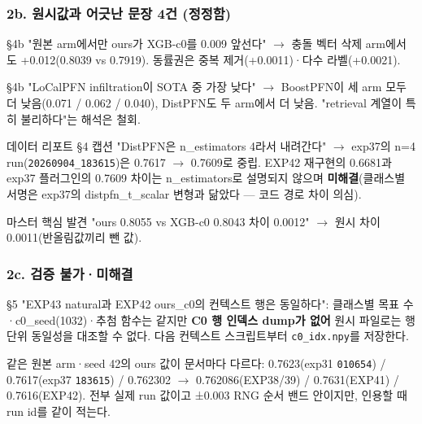 \subsubsection{2b. 원시값과 어긋난 문장 4건 (정정함)}
\par\noindent \textbullet{} §4b "원본 arm에서만 ours가 XGB-c0를 0.009 앞선다"  \ensuremath{\rightarrow}  충돌 벡터 삭제 arm에서도 +\allowbreak{}0.012(0.8039 vs 0.7919). 동률권은 중복 제거(+\allowbreak{}0.0011)·다수 라벨(+\allowbreak{}0.0021).


\par\noindent \textbullet{} §4b "LoCalPFN infiltration이 SOTA 중 가장 낮다"  \ensuremath{\rightarrow}  BoostPFN이 세 arm 모두 더 낮음(0.071 /\allowbreak{} 0.062 /\allowbreak{} 0.040), DistPFN도 두 arm에서 더 낮음. "retrieval 계열이 특히 불리하다"는 해석은 철회.


\par\noindent \textbullet\enspace 데이터 리포트 §4 캡션 "DistPFN은 n\_\allowbreak{}estimators 4라서 내려간다"  \ensuremath{\rightarrow}  exp37의 n=\allowbreak{}4 run(\texttt{20260904\allowbreak{}\_\allowbreak{}\allowbreak{}183615})은 0.7617 \ensuremath{\rightarrow} 0.7609로 중립. EXP42 재구현의 0.6681과 exp37 플러그인의 0.7609 차이는 n\_\allowbreak{}estimators로 설명되지 않으며 \textbf{미해결}(클래스별 서명은 exp37의 distpfn\_\allowbreak{}t\_\allowbreak{}scalar 변형과 닮았다 — 코드 경로 차이 의심).


\par\noindent \textbullet\enspace 마스터 핵심 발견 "ours 0.8055 vs XGB-c0 0.8043 차이 0.0012"  \ensuremath{\rightarrow}  원시 차이 0.0011(반올림값끼리 뺀 값).


\subsubsection{2c. 검증 불가·미해결}
\par\noindent \textbullet{} §5 "EXP43 natural과 EXP42 ours\_\allowbreak{}c0의 컨텍스트 행은 동일하다": 클래스별 목표 수·c0\_\allowbreak{}seed(1032)·추첨 함수는 같지만 \textbf{C0 행 인덱스 dump가 없어} 원시 파일로는 행 단위 동일성을 대조할 수 없다. 다음 컨텍스트 스크립트부터 \texttt{c0\_\allowbreak{}\allowbreak{}idx.\allowbreak{}n\allowbreak{}py}를 저장한다.


\par\noindent \textbullet\enspace 같은 원본 arm·seed 42의 ours 값이 문서마다 다르다: 0.7623(exp31 \texttt{010654}) /\allowbreak{} 0.7617(exp37 \texttt{183615}) /\allowbreak{} 0.762302 \ensuremath{\rightarrow} 0.762086(EXP38/\allowbreak{}39) /\allowbreak{} 0.7631(EXP41) /\allowbreak{} 0.7616(EXP42). 전부 실제 run 값이고 ±0.003 RNG 순서 밴드 안이지만, 인용할 때 run id를 같이 적는다.


